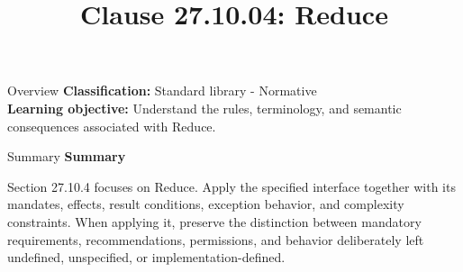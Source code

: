 \documentclass[10pt,letterpaper]{article}
\title{Clause 27.10.04: Reduce}
\author{}
\date{}
\begin{document}
\maketitle
\begin{CornellOverviewBox}{Overview}
\textbf{Classification:} Standard library - Normative\\[2pt]
\textbf{Learning objective:} Understand the rules, terminology, and semantic consequences associated with Reduce.
\end{CornellOverviewBox}\begin{CornellSummaryBox}{Summary}
{\sffamily\bfseries\color{Accent} Summary}\par\vspace{3pt}Section 27.10.4 focuses on Reduce. Apply the specified interface together with its mandates, effects, result conditions, exception behavior, and complexity constraints. When applying it, preserve the distinction between mandatory requirements, recommendations, permissions, and behavior deliberately left undefined, unspecified, or implementation-defined.
\end{CornellSummaryBox}
\end{document}
